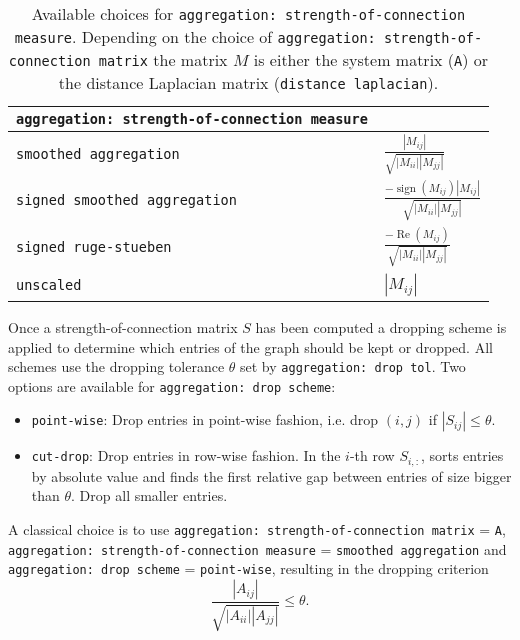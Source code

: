 \begin{table}[H]
  \begin{center}
    \begin{tabular}{ll}
      \verb!aggregation: strength-of-connection measure! & \\
      \toprule
      \verb!smoothed aggregation! & \(\frac{\left|M_{ij}\right|}{\sqrt{\left|M_{ii}\right|\left|M_{jj}\right|}} \) \\
      \verb!signed smoothed aggregation! & \(\frac{-\operatorname{sign} \left(M_{ij}\right) \left|M_{ij}\right|}{\sqrt{\left|M_{ii}\right|\left|M_{jj}\right|}} \) \\
      \verb!signed ruge-stueben! & \(\frac{-\operatorname{Re} \left(M_{ij}\right)}{\sqrt{\left|M_{ii}\right|\left|M_{jj}\right|}} \) \\
      \verb!unscaled! & \(\left|M_{ij}\right|\) \\
      \bottomrule
    \end{tabular}
    \caption{Available choices for \texttt{aggregation: strength-of-connection measure}. Depending on the choice of \texttt{aggregation: strength-of-connection matrix} the matrix \(M\) is either the system matrix (\texttt{A}) or the distance Laplacian matrix (\texttt{distance laplacian}).}
\label{t:aggregation_soc_measures}
  \end{center}
\end{table}


Once a strength-of-connection matrix \(S\) has been computed a dropping scheme is applied to determine which entries of the graph should be kept or dropped.
All schemes use the dropping tolerance \(\theta\) set by \texttt{aggregation: drop tol}.
Two options are available for \texttt{aggregation: drop scheme}:
\begin{itemize}
\item \texttt{point-wise}: Drop entries in point-wise fashion, i.e. drop \((i,j)\) if \(\left|S_{ij}\right|\leq\theta\).
\item \texttt{cut-drop}: Drop entries in row-wise fashion. In the \(i\)-th row \(S_{i,:}\), sorts entries by absolute value and finds the first relative gap between entries of size bigger than \(\theta\). Drop all smaller entries.
\end{itemize}

A classical choice is to use \texttt{aggregation: strength-of-connection matrix} = \texttt{A}, \texttt{aggregation: strength-of-connection measure} = \texttt{smoothed aggregation} and \texttt{aggregation: drop scheme} = \texttt{point-wise}, resulting in the dropping criterion
\begin{equation}
  \frac{\left|A_{ij}\right|}{\sqrt{\left|A_{ii}\right|\left|A_{jj}\right|}} \leq \theta.
\end{equation}

